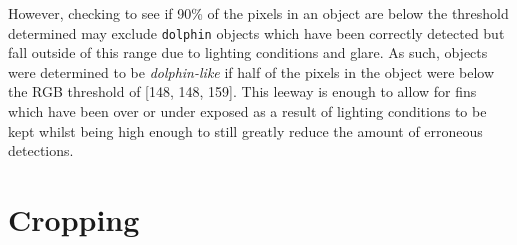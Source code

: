 However, checking to see if 90\% of the pixels in an object are below the threshold determined may exclude \texttt{dolphin} objects which have been correctly detected but fall outside of this range due to lighting conditions and glare. As such, objects were determined to be \textit{dolphin-like} if half of the pixels in the object were below the RGB threshold of  [148, 148, 159]. This leeway is enough to allow for fins which have been over or under exposed as a result of lighting conditions to be kept whilst being high enough to still greatly reduce the amount of erroneous detections. 


\section{Cropping}\label{ch:postProcessing,sec:cropping}


